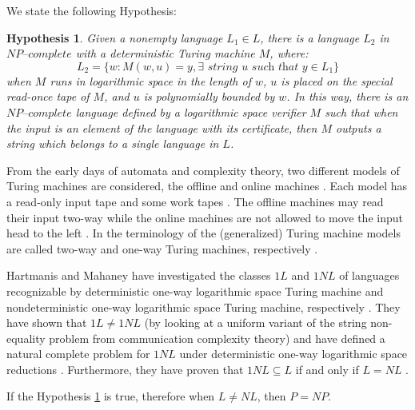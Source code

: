 \documentclass[a4paper,UKenglish,cleveref, autoref]{lipics-v2019}
\newtheorem{hypothesis}[theorem]{Hypothesis}
\begin{document}
We state the following Hypothesis:

\begin{hypothesis}
\label{hypothesis1}
Given a nonempty language $L_{1} \in L$, there is a language $L_{2}$ in $\textit{NP--complete}$ with a deterministic Turing machine $M$, where:
\[L_{2} = \{w: M(w, u) = y, \exists \textit{ string } u \textit{ such that } y \in L_{1}\}\]
when $M$ runs in logarithmic space in the length of $w$, $u$ is placed on the special read-once tape of $M$, and $u$ is polynomially bounded by $w$. In this way, there is an $\textit{NP--complete}$ language defined by a logarithmic space verifier $M$ such that when the input is an element of the language with its certificate, then $M$ outputs a string which belongs to a single language in $L$.
\end{hypothesis}

From the early days of automata and complexity theory,  two  different  models  of  Turing  machines  are  considered, the offline and online machines \cite{KU15}. Each model has a read-only input tape and some work tapes \cite{KU15}. The offline machines may read their input two-way while the online machines are not allowed to move the input head to the left \cite{KU15}. In the terminology of the (generalized) Turing machine models are called two-way and one-way Turing machines, respectively \cite{KU15}.

Hartmanis and Mahaney have investigated the classes $1L$ and $1NL$ of languages recognizable by deterministic one-way logarithmic space Turing machine and nondeterministic one-way logarithmic space Turing machine, respectively \cite{HM81}. They have shown that $1L \neq 1NL$ (by looking at a uniform variant of the string non-equality problem from communication complexity theory) and have defined a natural complete problem for $1NL$ under deterministic one-way logarithmic space reductions \cite{HM81}. Furthermore, they have proven that $1NL \subseteq L$ if and only if $L=NL$ \cite{HM81}.

\begin{theorem}
\label{neg-implication}
If the Hypothesis \ref{hypothesis1} is true, therefore when $L \neq NL$, then $P = NP$.
\end{theorem}
\end{document}
